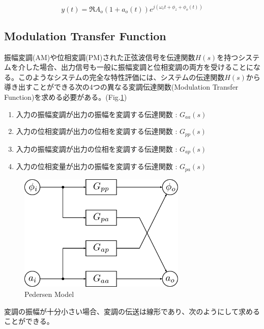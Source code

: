\documentclass[book]{jlreq}
\begin{document}
\begin{equation}
    y(t) = \Re{A_o(1+a_o(t))e^{j(\omega_c t+\phi_z + \phi_o(t))}}
\end{equation}

\subsection{Modulation Transfer Function}

振幅変調(AM)や位相変調(PM)された正弦波信号を伝達関数$H(s)$を持つシステムを介した場合、出力信号も一般に振幅変調と位相変調の両方を受けることになる。このようなシステムの完全な特性評価には、システムの伝達関数$H(s)$から導き出すことができる次の4つの異なる変調伝達関数(Modulation Transfer Function)を求める必要がある。(Fig.\ref{fig:PM})
%
\begin{enumerate}
    \item 入力の振幅変調が出力の振幅を変調する伝達関数 : $G_{aa}(s)$
    \item 入力の位相変調が出力の位相を変調する伝達関数 : $G_{pp}(s)$
    \item 入力の振幅変調が出力の位相を変調する伝達関数 : $G_{ap}(s)$
    \item 入力の位相変量が出力の振幅を変調する伝達関数 : $G_{pa}(s)$
\end{enumerate}
%
\begin{figure}[hbt]
    \begin{center}
        \includegraphics[width=8cm,clip]{figs/Pedersen_Model.pdf}
        \caption{Pedersen Model}
        \label{fig:PM}
    \end{center}
\end{figure}
%
変調の振幅が十分小さい場合、変調の伝送は線形であり、次のようにして求めることができる。
\end{document}

